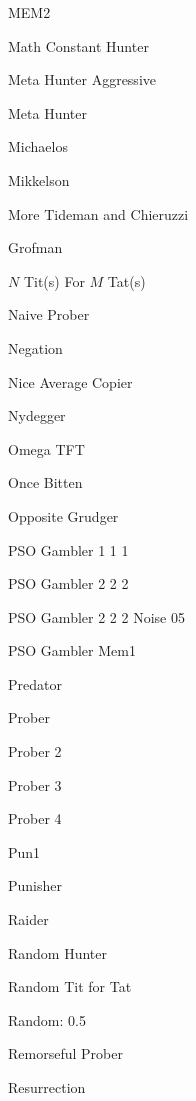 \item MEM2~\cite{Li2014}
\item Math Constant Hunter~\cite{axelrodproject}
\item Meta Hunter Aggressive~\cite{axelrodproject}
\item Meta Hunter~\cite{axelrodproject}
\item Michaelos~\cite{LessWrong2011}
\item Mikkelson~\cite{Axelrod1980b}
\item More Tideman and Chieruzzi~\cite{Axelrod1980b}
\item Grofman~\cite{Axelrod1980b}
\item \(N\) Tit(s) For \(M\) Tat(s)~\cite{axelrodproject}
\item Naive Prober~\cite{Li2011}
\item Negation~\cite{PD2017}
\item Nice Average Copier~\cite{axelrodproject}
\item Nydegger~\cite{Axelrod1980a}
\item Omega TFT~\cite{kendall2007iterated}
\item Once Bitten~\cite{axelrodproject}
\item Opposite Grudger~\cite{axelrodproject}
\item PSO Gambler 1 1 1~\cite{axelrodproject}
\item PSO Gambler 2 2 2~\cite{axelrodproject}
\item PSO Gambler 2 2 2 Noise 05~\cite{axelrodproject}
\item PSO Gambler Mem1 \cite{axelrodproject}
\item Predator~\cite{Ashlock2006}
\item Prober~\cite{Li2011}
\item Prober 2~\cite{prison}
\item Prober 3~\cite{prison}
\item Prober 4~\cite{prison}
\item Pun1~\cite{Ashlock2006}
\item Punisher~\cite{axelrodproject}
\item Raider~\cite{Ashlock2014}
\item Random Hunter~\cite{axelrodproject}
\item Random Tit for Tat~\cite{axelrodproject}
\item Random: 0.5~\cite{Axelrod1980a, Tzafestas2000}
\item Remorseful Prober~\cite{Li2011}
\item Resurrection~\cite{Eckhart2015}

